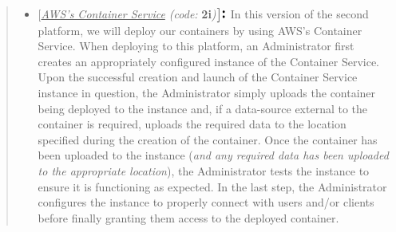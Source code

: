 \documentclass{article}[12pt]
\numberwithin{equation}{section}
\begin{document}
\begin{flushleft}
\begin{spacing}{1.5}
	\begin{quote}
		\begin{itemize}
			\vspace{0.05in}
			\item $\bigl[$\normalsize{\emph{\underline{AWS's Container Service} (code:} \textbf{2i}\emph{)}}$\bigr]\text{\Large{\textbf{:}}}$ In this version of the second platform, we will deploy our containers by using AWS's Container Service.  When deploying to this platform, an Administrator first creates an appropriately configured instance of the Container Service.  Upon the successful creation and launch of the Container Service instance in question, the Administrator simply uploads the container being deployed to the instance and, if a data-source external to the container is required, uploads the required data to the location specified during the creation of the container.  Once the container has been uploaded to the instance (\emph{and any required data has been uploaded to the appropriate location}), the Administrator tests the instance to ensure it is functioning as expected.  In the last step, the Administrator configures the instance to properly connect with users and/or clients before finally granting them access to the deployed container. 
			\vspace{0.075in}

\end{itemize}
\end{quote}
\end{spacing}
\end{flushleft}
\end{document}
